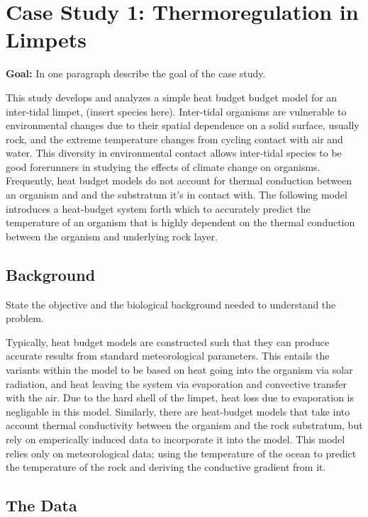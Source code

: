 \documentclass{article}
\begin{document}
\section{Case Study 1: Thermoregulation in Limpets}

\textbf{Goal:} In one paragraph describe the goal of the case study.

This study develops and analyzes a simple heat budget budget model for an inter-tidal limpet, (insert species here). Inter-tidal organisms are vulnerable to environmental changes due to their spatial dependence on a solid surface, usually rock, and the extreme temperature changes from cycling contact with air and water. This diversity in environmental contact allows inter-tidal species to be good forerunners in studying the effects of climate change on organisms. 
Frequently, heat budget models do not account for thermal conduction between an organism and and the substratum it's in contact with. The following model introduces a heat-budget system forth which to accurately predict the temperature of an organism that is highly dependent on the thermal conduction between the organism and underlying rock layer. 

\subsection{Background}

State the objective and the biological background needed to understand the problem.

Typically, heat budget models are constructed such that they can produce accurate results from standard meteorological parameters. This entails the variants within the model to be based on heat going into the organism via solar radiation, and heat leaving the system via evaporation and convective transfer with the air. Due to the hard shell of the limpet,  heat loss due to evaporation is negligable in this model.
Similarly, there are heat-budget models that take into account thermal conductivity between the organism and the rock substratum, but rely on emperically induced data to incorporate it into the model. This model relies only on meteorological data; using the temperature of the ocean to predict the temperature of the rock and deriving the conductive gradient from it. 

\subsection{The Data}
\end{document}
